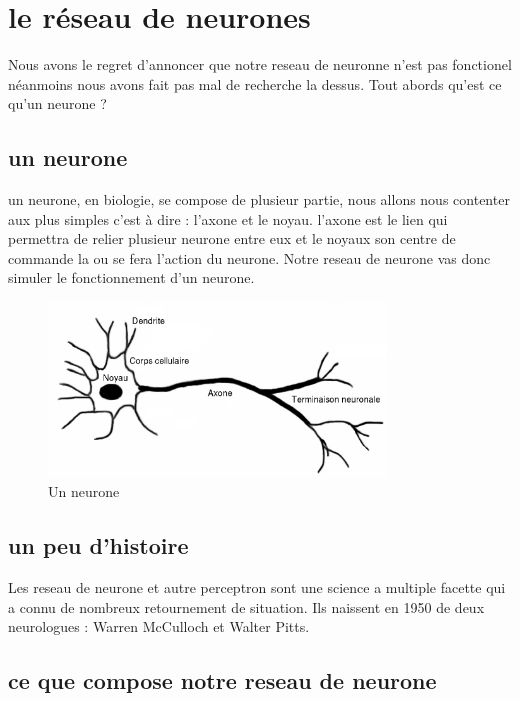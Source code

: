 \section{le réseau de neurones}
Nous avons le regret d'annoncer que notre reseau de neuronne n'est pas fonctionel
néanmoins nous avons fait pas mal de recherche la dessus. Tout abords qu'est ce qu'un neurone ? 
\subsection{un neurone}
un neurone, en biologie, se compose de plusieur partie, nous allons nous contenter aux plus simples c'est à dire : l'axone et le noyau. l'axone est le lien qui permettra de relier plusieur neurone entre eux et le noyaux son centre de commande la ou se fera l'action du neurone. Notre reseau de neurone vas donc simuler le fonctionnement d'un neurone.
\begin{figure}[h]
  \center
  \includegraphics[width=0.80\textwidth]{neurone.png}
  \caption{Un neurone}
\end{figure}
\subsection{un peu d'histoire}
Les reseau de neurone et autre perceptron sont une science a multiple facette qui a connu de nombreux retournement de situation. Ils naissent en 1950 de deux neurologues : Warren McCulloch et Walter Pitts.
\subsection{ce que compose notre reseau de neurone}
